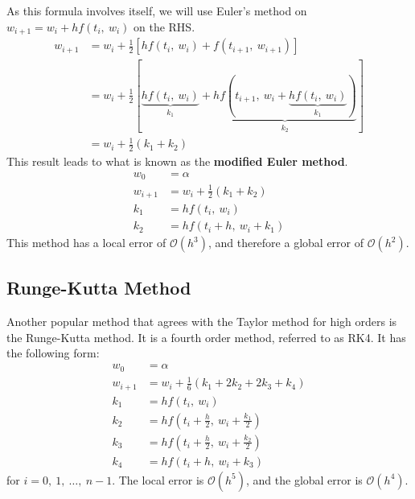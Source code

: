 \documentclass{article}
\begin{document}
As this formula involves itself, we will use Euler's method on
\(w_{i + 1} = w_i + h f\left( t_i,\: w_i \right)\) on the RHS\@.
\begin{align*}
    w_{i + 1} & = w_i + \frac{1}{2} \left[ h f\left( t_i,\: w_i \right) + f\left( t_{i + 1},\: w_{i + 1} \right) \right]                                                                                     \\
              & = w_i + \frac{1}{2} \left[ \underbrace{h f\left( t_i,\: w_i \right)}_{k_1} + \underbrace{h f\left( t_{i + 1},\: w_i + \underbrace{h f\left( t_i,\: w_i \right)}_{k_1} \right)}_{k_2} \right] \\
              & = w_i + \frac{1}{2} \left( k_1 + k_2 \right)
\end{align*}
This result leads to what is known as the \textbf{modified Euler method}.
\begin{align*}
    w_0       & = \alpha                                     \\
    w_{i + 1} & = w_i + \frac{1}{2} \left( k_1 + k_2 \right) \\
    k_1       & = h f\left( t_i,\: w_i \right)               \\
    k_2       & = h f\left( t_i + h,\: w_i + k_1 \right)
\end{align*}
This method has a local error of \(\mathcal{O}\left( h^3 \right)\), and therefore a global error of \(\mathcal{O}\left( h^2 \right)\).
\subsection{Runge-Kutta Method}
Another popular method that agrees with the Taylor method for high orders is the Runge-Kutta method.
It is a fourth order method, referred to as RK4. It has the following form:
\begin{align*}
    w_0       & = \alpha                                                     \\
    w_{i + 1} & = w_i + \frac{1}{6} \left( k_1 + 2 k_2 + 2 k_3 + k_4 \right) \\
    k_1       & = h f\left( t_i,\: w_i \right)                               \\
    k_2       & = h f\left( t_i + \frac{h}{2},\: w_i + \frac{k_1}{2} \right) \\
    k_3       & = h f\left( t_i + \frac{h}{2},\: w_i + \frac{k_2}{2} \right) \\
    k_4       & = h f\left( t_i + h,\: w_i + k_3 \right)
\end{align*}
for \(i = 0,\: 1,\: \ldots,\: n - 1\). The local error is \(\mathcal{O}\left( h^5 \right)\), and the global error is \(\mathcal{O}\left( h^4 \right)\).
\end{document}
